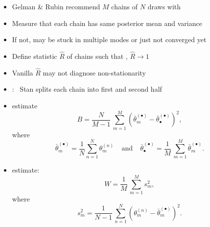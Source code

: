 \documentclass[10pt]{report}
\begin{document}
%
\begin{itemize}
\item Gelman \& Rubin recommend $M$ chains of $N$ draws with
\item Measure that each chain has same posterior mean and variance
\item If not, may be stuck in multiple modes or just not converged yet
\item Define statistic $\hat{R}$ of chains such that ,
$\hat{R} \rightarrow 1$
\end{itemize}


\begin{itemize}
\item Vanilla $\hat{R}$ may not diagnose non-stationarity
\item {}: \ Stan splits each chain into first and
  second half
\end{itemize}


%
\begin{itemize}
\item {} estimate
\[\textstyle
B
= \frac{N}{M-1} \, \sum_{m=1}^M (\bar{\theta}^{(\bullet)}_{m} - \bar{\theta}^{(\bullet)}_{\bullet})^2,
\]
%
where
%
\[\textstyle
\bar{\theta}_m^{(\bullet)}
= \frac{1}{N} \sum_{n = 1}^N \theta_m^{(n)}
\ \ \ \ \
\mbox{and}
\ \ \ \ \
\bar{\theta}^{(\bullet)}_{\bullet}
= \frac{1}{M} \, \sum_{m=1}^M \bar{\theta}_m^{(\bullet)}.
\]
\vspace*{6pt}
\item {} estimate:
\[\textstyle
W 
= \frac{1}{M} \, \sum_{m=1}^M s_m^2,
\]
where
\[\textstyle
s_m^2 = \frac{1}{N-1} \, \sum_{n=1}^N (\theta^{(n)}_m - \bar{\theta}^{(\bullet)}_m)^2.
\]
\end{itemize}
\end{document}
